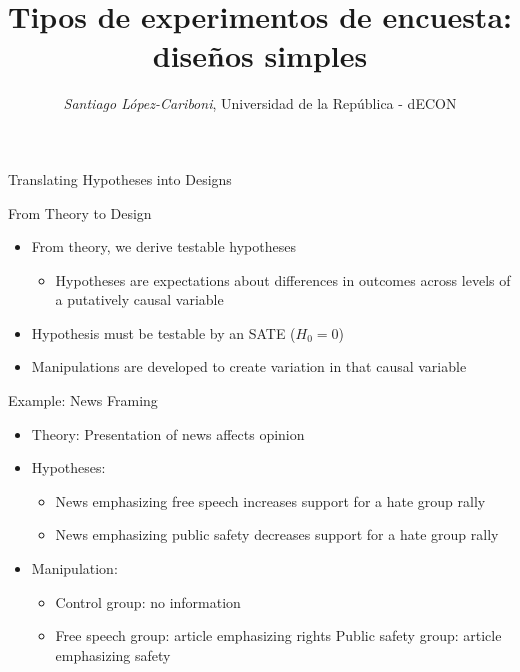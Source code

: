 \documentclass[
  ignorenonframetext,
]{beamer}
\title{Tipos de experimentos de encuesta: diseños simples}
\author{\emph{Santiago López-Cariboni}, Universidad de la República -
dECON}
\date{}
\providecommand{\tightlist}{%
  \setlength{\itemsep}{0pt}\setlength{\parskip}{0pt}}
\begin{document}
\frame{\titlepage}

\begin{frame}{Translating Hypotheses into Designs}
\protect\hypertarget{translating-hypotheses-into-designs}{}
\end{frame}

\begin{frame}{From Theory to Design}
\protect\hypertarget{from-theory-to-design}{}
\begin{itemize}
\tightlist
\item
  From theory, we derive testable hypotheses

  \begin{itemize}
  \tightlist
  \item
    Hypotheses are expectations about differences in outcomes across
    levels of a putatively causal variable
  \end{itemize}
\item
  Hypothesis must be testable by an SATE (\(H_0 = 0\))
\item
  Manipulations are developed to create variation in that causal
  variable
\end{itemize}
\end{frame}

\begin{frame}{Example: News Framing}
\protect\hypertarget{example-news-framing}{}
\begin{itemize}
\tightlist
\item
  Theory: Presentation of news affects opinion
\item
  Hypotheses:

  \begin{itemize}
  \tightlist
  \item
    News emphasizing free speech increases support for a hate group
    rally
  \item
    News emphasizing public safety decreases support for a hate group
    rally
  \end{itemize}
\item
  Manipulation:

  \begin{itemize}
  \tightlist
  \item
    Control group: no information
  \item
    Free speech group: article emphasizing rights Public safety group:
    article emphasizing safety
  \end{itemize}
\end{itemize}
\end{frame}
\end{document}
